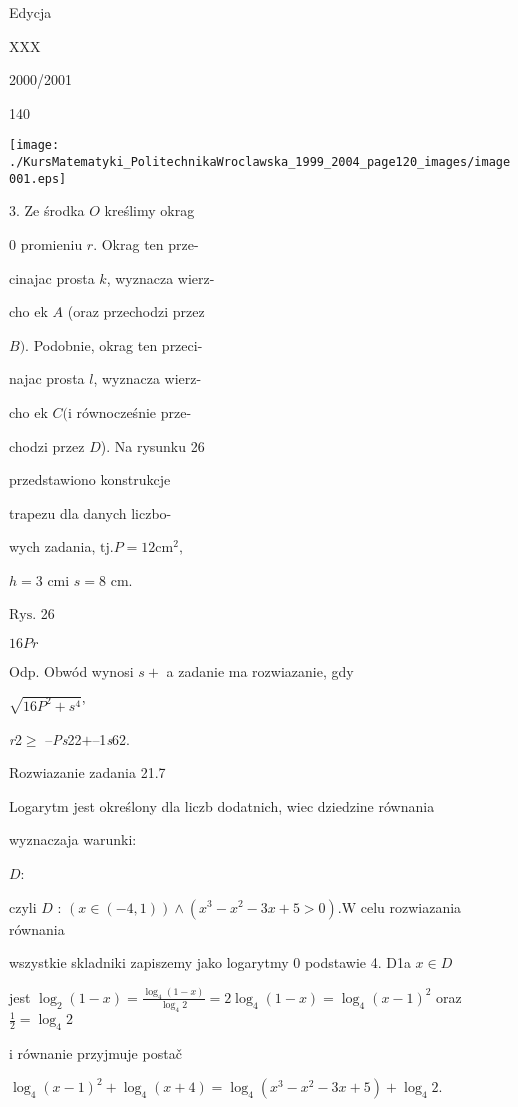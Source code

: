 \documentclass[a4paper,12pt]{article}
\begin{document}
Edycja

XXX

2000/2001





140
\begin{center}
\texttt{[image: ./KursMatematyki\_PolitechnikaWroclawska\_1999\_2004\_page120\_images/image001.eps]}
\end{center}
3. Ze środka $O$ kreślimy okrag

$0$ promieniu $r$. Okrag ten prze-

cinajac prosta $k$, wyznacza wierz-

cho ek $A$ (oraz przechodzi przez

$B)$. Podobnie, okrag ten przeci-

najac prosta $l$, wyznacza wierz-

cho ek $C (\mathrm{i}$ równocześnie prze-

chodzi przez $D$). Na rysunku 26

przedstawiono konstrukcje

trapezu dla danych liczbo-

wych zadania, $\mathrm{t}\mathrm{j}. P = 12 \mathrm{c}\mathrm{m}^{2},$

$h=3$ cmi $s=8$ cm.

$\mathrm{R}\mathrm{y}\mathrm{s}$. 26

$16Pr$

Odp. Obwód wynosi $s+$ a zadanie ma rozwiazanie, gdy

$\sqrt{16P^{2}+s^{4}}$'

{\it r}2$\geq$ --{\it Ps}22$+$--1{\it s}62.

Rozwiazanie zadania 21.7

Logarytm jest określony dla liczb dodatnich, wiec dziedzine równania

wyznaczaja warunki:

$D$: 

czyli $D$ : $(x\in(-4,1))\wedge(x^{3}-x^{2}-3x+5>0). \mathrm{W}$ celu rozwiazania równania

wszystkie skladniki zapiszemy jako logarytmy $0$ podstawie 4. D1a $x \in D$

jest $\displaystyle \log_{2}(1-x)=\frac{\log_{4}(1-x)}{\log_{4}2}=2\log_{4}(1-x)=\log_{4}(x-1)^{2}$ oraz $\displaystyle \frac{1}{2}=\log_{4}2$

$\mathrm{i}$ równanie przyjmuje postač

$\log_{4}(x-1)^{2}+\log_{4}(x+4)=\log_{4}(x^{3}-x^{2}-3x+5)+\log_{4}2.$
\end{document}
